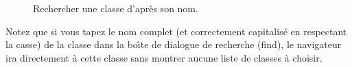 \documentclass[a4paper,10pt,twoside]{book}
\begin{document}
\begin{figure}[hbt]
\centerline{
}
\caption{Rechercher une classe d'apr\`es son nom.\label{fig:findit}}
\end{figure}

Notez que si vous tapez le nom complet (et correctement capitalis\'e 
\cad en respectant la casse)
de la classe dans la bo\^{\i}te de dialogue de recherche (find), le
navigateur ira directement \`a cette classe sans montrer aucune liste
de classes \`a choisir.
\end{document}
